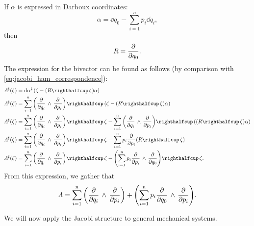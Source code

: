 If \(\alpha\) is expressed in Darboux coordinates:
\begin{equation}
     \alpha = \dd{q}_0 - \sum^n_{i = 1} p_i\dd{q_i},
\end{equation}
then
\begin{equation}
     R = \pdv{}{q_0}.
\end{equation}
The expression for the bivector can be found as follows (by comparison with \cref{eq:jacobi_ham_correspondence}):
\begin{equation}
    \begin{split}
        \fromDual{\Lambda}(\zeta) &= \fromDual{\dd{\alpha}}\qty(\zeta - (\intpr{R}{\zeta})\alpha) \\
        \fromDual{\Lambda}(\zeta) &= \intpr{\sum_{i=1}^n\qty(\wedgep{\pdv{}{q_i}}{\pdv{}{p_i}})}{(\zeta - (\intpr{R}{\zeta})\alpha)} \\
        \fromDual{\Lambda}(\zeta) &= \intpr{\sum_{i=1}^n\qty(\wedgep{\pdv{}{q_i}}{\pdv{}{p_i}})}{\zeta} 
                                     - \intpr{\sum_{i=1}^n\qty(\wedgep{\pdv{}{q_i}}{\pdv{}{p_i}})}{((\intpr{R}{\zeta})\alpha)} \\
        \fromDual{\Lambda}(\zeta) &= \intpr{\sum_{i=1}^n\qty(\wedgep{\pdv{}{q_i}}{\pdv{}{p_i}})}{\zeta} 
                                     - \sum_{i=1}^n p_i \pdv{}{p_i}(\intpr{R}{\zeta}) (\intpr{R}{\zeta})\\
        \fromDual{\Lambda}(\zeta) &= \intpr{\sum_{i=1}^n\qty(\wedgep{\pdv{}{q_i}}{\pdv{}{p_i}})}{\zeta} 
                                     - \intpr{\qty(\sum_{i=1}^n p_i \wedgep{\pdv{}{p_i}}{\pdv{}{q_0}})}{\zeta}. \\
    \end{split}
\end{equation}
From this expression, we gather that 
\begin{equation}
     \Lambda = \sum_{i=1}^n \qty( \pdv{}{q_i}\,\wedge\,\pdv{}{p_i} ) + \qty(\sum_{i=1}^n p_i  \pdv{}{q_0}\,\wedge\,\pdv{}{p_i} ).
\end{equation}

We will now apply the Jacobi structure to general mechanical systems.

